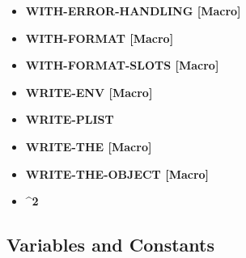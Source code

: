 \documentclass [11pt]{book}
\begin{document}
\begin{itemize}
\item {}
\textbf{WITH-ERROR-HANDLING [Macro]}





\item {}
\textbf{WITH-FORMAT [Macro]}





\item {}
\textbf{WITH-FORMAT-SLOTS [Macro]}





\item {}
\textbf{WRITE-ENV [Macro]}





\item {}
\textbf{WRITE-PLIST}





\item {}
\textbf{WRITE-THE [Macro]}





\item {}
\textbf{WRITE-THE-OBJECT [Macro]}





\item {}
\textbf{^2}





\end{itemize}



\subsection{Variables and Constants}

\label{subsec:variablesandconstants}
\end{document}
